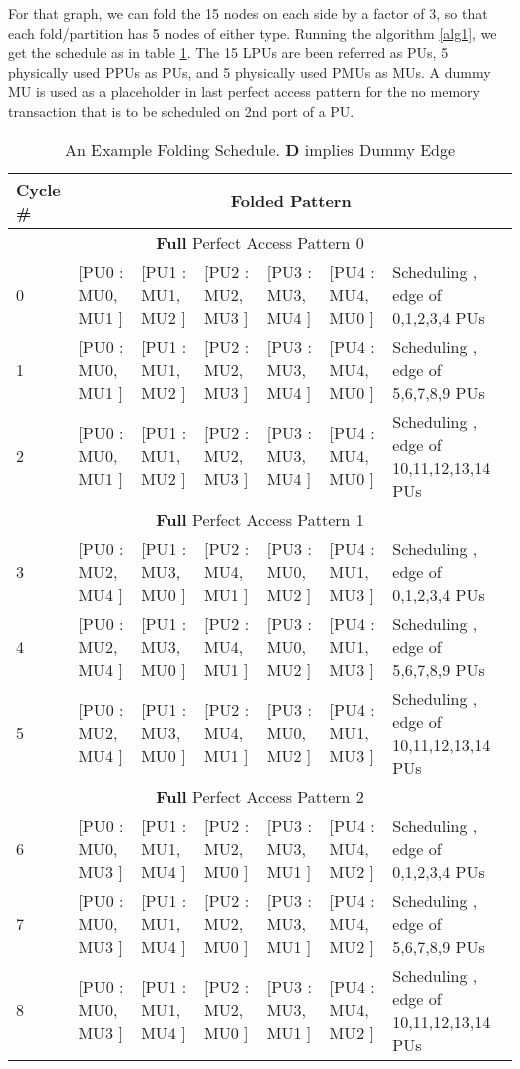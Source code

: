 \documentclass[12pt]{article}
\begin{document}
For that graph, we can fold the 15 nodes on each side by a factor of 3, so
that each fold/partition has 5 nodes of either type. Running the algorithm
\ref{alg1}, we get the schedule as in table \ref{fold_ex_tab}. The 15
LPUs are been referred as PUs, 5 physically used PPUs as
PUs, and 5 physically used
PMUs as MUs. A dummy MU is used as a placeholder in last perfect access pattern
for the no memory transaction that is to be scheduled on 2nd port of a
PU.

\begin{table}[!h]
\caption{An Example Folding Schedule. \textbf{D} implies Dummy Edge}
\label{fold_ex_tab}
\centering
{\scriptsize
\begin{tabular}[!h]{|p{0.4cm}|p{2cm}|p{2cm}|p{2cm}|p{2cm}|p{2cm}|p{2.3cm}|}
\hline
Cycle \# & \multicolumn{6}{|c|}{Folded Pattern} \\ \hline \hline 
\multicolumn{7}{|c|}{\textbf{Full} Perfect Access Pattern 0} \\ \hline \hline 
 
0 & [PU0 : MU0, MU1 ] & [PU1 : MU1, MU2 ] & [PU2 : MU2, MU3 ] & [PU3 : MU3, MU4 ] & [PU4 : MU4, MU0 ]  & Scheduling ,  edge of {0,1,2,3,4} PUs \\ \hline \hline 
1 & [PU0 : MU0, MU1 ] & [PU1 : MU1, MU2 ] & [PU2 : MU2, MU3 ] & [PU3 : MU3, MU4 ] & [PU4 : MU4, MU0 ]  & Scheduling ,  edge of {5,6,7,8,9} PUs \\ \hline 
2 & [PU0 : MU0, MU1 ] & [PU1 : MU1, MU2 ] & [PU2 : MU2, MU3 ] & [PU3 : MU3, MU4 ] & [PU4 : MU4, MU0 ]  & Scheduling ,  edge of {10,11,12,13,14} PUs \\ \hline \hline 
\multicolumn{7}{|c|}{\textbf{Full} Perfect Access Pattern 1} \\ \hline \hline 
 
3 & [PU0 : MU2, MU4 ] & [PU1 : MU3, MU0 ] & [PU2 : MU4, MU1 ] & [PU3 : MU0, MU2 ] & [PU4 : MU1, MU3 ]  & Scheduling ,  edge of {0,1,2,3,4} PUs \\ \hline 
4 & [PU0 : MU2, MU4 ] & [PU1 : MU3, MU0 ] & [PU2 : MU4, MU1 ] & [PU3 : MU0, MU2 ] & [PU4 : MU1, MU3 ]  & Scheduling ,  edge of {5,6,7,8,9} PUs \\ \hline 
5 & [PU0 : MU2, MU4 ] & [PU1 : MU3, MU0 ] & [PU2 : MU4, MU1 ] & [PU3 : MU0, MU2 ] & [PU4 : MU1, MU3 ]  & Scheduling ,  edge of {10,11,12,13,14} PUs \\ \hline \hline 
\multicolumn{7}{|c|}{\textbf{Full} Perfect Access Pattern 2} \\ \hline \hline 
 
6 & [PU0 : MU0, MU3 ] & [PU1 : MU1, MU4 ] & [PU2 : MU2, MU0 ] & [PU3 : MU3, MU1 ] & [PU4 : MU4, MU2 ]  & Scheduling ,  edge of {0,1,2,3,4} PUs \\ \hline 
7 & [PU0 : MU0, MU3 ] & [PU1 : MU1, MU4 ] & [PU2 : MU2, MU0 ] & [PU3 : MU3, MU1 ] & [PU4 : MU4, MU2 ]  & Scheduling ,  edge of {5,6,7,8,9} PUs \\ \hline 
8 & [PU0 : MU0, MU3 ] & [PU1 : MU1, MU4 ] & [PU2 : MU2, MU0 ] & [PU3 : MU3, MU1 ] & [PU4 : MU4, MU2 ]  & Scheduling ,  edge of {10,11,12,13,14} PUs \\ \hline \hline 
 

\end{tabular}}
\end{table}
\end{document}

